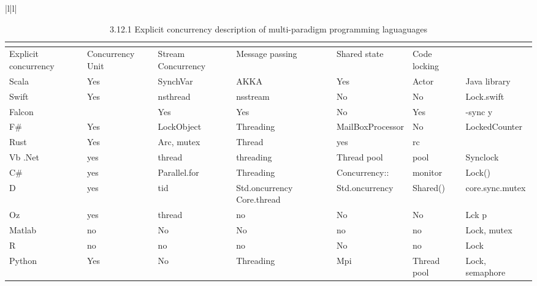\documentclass{sig-alternate}
\begin{document}
\begin{table}[]
\begin{tabular}{|l|l|}
\begin{table}[]
\centering
\caption{3.12.1 Explicit concurrency description of multi-paradigm programming laguaguages}
\hline
\label{my-label}
\begin{tabular}{|l|l|l|l|l|l|l|}
\multicolumn{2}{|c|}{}                     \\ \hline
Explicit concurrency & Concurrency Unit & Stream Concurrency & Message passing            & Shared state     & Code locking &                 \\ \hline
Scala                & Yes              & SynchVar           & AKKA                       & Yes              & Actor        & Java library    \\ \hline
Swift                & Yes              & nsthread           & nsstream                   & No               & No           & Lock.swift      \\ \hline
Falcon               &                  & Yes                & Yes                        & No               & Yes          & -sync y         \\ \hline
F\#                  & Yes              & LockObject         & Threading                  & MailBoxProcessor & No           & LockedCounter   \\ \hline
Rust                 & Yes              & Arc, mutex         & Thread                     & yes              & rc           &                 \\ \hline
Vb .Net              & yes              & thread             & threading                  & Thread pool      & pool         & Synclock        \\ \hline
C\#                  & yes              & Parallel.for       & Threading                  & Concurrency::    & monitor      & Lock()          \\ \hline
D                    & yes              & tid                & Std.oncurrency Core.thread & Std.oncurrency   & Shared()     & core.sync.mutex \\ \hline
Oz                   & yes              & thread             & no                         & No               & No           & Lck p           \\ \hline
Matlab               & no               & No                 & No                         & no               & no           & Lock, mutex     \\ \hline
R                    & no               & no                 & no                         & No               & no           & Lock            \\ \hline
Python               & Yes              & No                 & Threading                  & Mpi              & Thread pool  & Lock, semaphore \\ \hline
\end{tabular}
\end{table}


\end{tabular}
\end{table}
\end{document}
